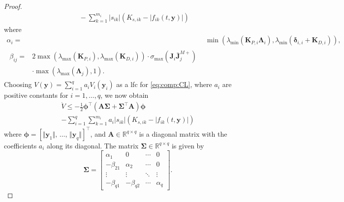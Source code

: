 \documentclass[../main.tex]{subfiles}
\begin{document}
\begin{proof}
\begin{equation}
\begin{split}
    & \quad - \sum_{k=1}^{m_i} |s_{ik}| \left( K_{s,ik} - |f_{ik}(t,\bm{y})| \right)
    \end{split}
\end{equation}
where
\begin{subequations}\label{eq:comp:alphabeta}
    \begin{align}
        \alpha_i ={}& \min \left( \lambda_{\min}(\bm{K}_{P,i} \bm{\Lambda}_i), \lambda_{\min}(\bm{\delta}_{i,i} + \bm{K}_{D,i})\right),\\
        \begin{split}
            \beta_{ij} ={}& 2 \max \left( \lambda_{\max}(\bm{K}_{P,i} ), \lambda_{\max}(\bm{K}_{D,i})\right)\cdot \sigma_{\max}( \bm{J}_i \bar{\bm{J}}_j^{M+} ) \\
            &\cdot \max \left( \lambda_{\max}(\bm{\Lambda}_j),1\right).
        \end{split}
    \end{align}
\end{subequations}
Choosing $V(\bm{y}) = \sum_{i=1}^{q} a_i V_i(\bm{y}_i)$ as a \gls{lfc} for \cref{eq:comp:CL}, where $a_i$ are positive constants for $i=1,\ldots,q$, we now obtain
\begin{multline}
    \label{eq:comp:Vdot_bound}
    \dot{V} \leq -\tfrac{1}{2} \bm{\phi}^\top (\bm{A} \bm{\Sigma} + \bm{\Sigma}^\top \bm{A} ) \bm{\phi} \\
    - \sum_{i=1}^{q} \sum_{k=1}^{m_i} a_i  |s_{ik}| \left( K_{s,ik} - |f_{ik}(t,\bm{y})| \right)
\end{multline}
where $\bm{\phi} = \left[ \Vert \bm{y}_1 \Vert,\, \ldots,\, \Vert \bm{y}_q \Vert   \right]^\top$, and $\bm{A} \in \mathbb{R}^{q\times q}$ is a diagonal matrix with the coefficients $a_i$ along its diagonal. The matrix $\bm{\Sigma} \in \mathbb{R}^{q\times q}$ is given by
\begin{equation}\label{eq:comp:S}
    \bm{\Sigma} = \left[ \begin{smallmatrix}
        \alpha_1 & 0 & \cdots & 0\\
        -\beta_{21} & \alpha_2 & \cdots & 0\\
        \vdots & \vdots & \ddots & \vdots\\
        -\beta_{q1} & -\beta_{q2} & \cdots & \alpha_q
        \end{smallmatrix} \right].
\end{equation}



\end{proof}
\end{document}
